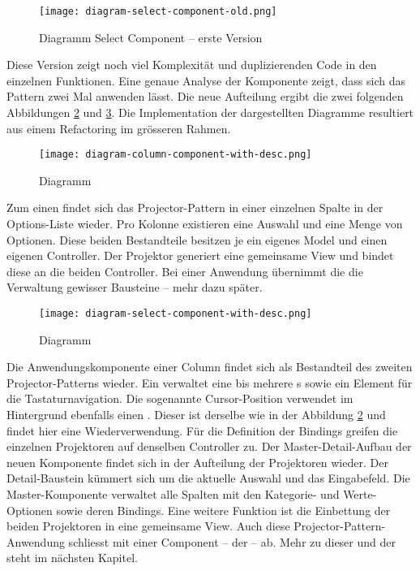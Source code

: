 \begin{figure}[!htb]
    \centering
    \texttt{[image: diagram-select-component-old.png]}
    \caption{\centering Diagramm Select Component – erste Version}
    \label{img:diagramSelectComponentOld}
\end{figure}

Diese Version zeigt noch viel Komplexität und duplizierenden Code in den einzelnen Funktionen. 
Eine genaue Analyse der Komponente zeigt, dass sich das Pattern zwei Mal anwenden lässt. 
Die neue Aufteilung ergibt die zwei folgenden Abbildungen \ref{img:diagramColumnComponent} und \ref{img:diagramSelectComponent}. 
Die Implementation der dargestellten Diagramme resultiert aus einem Refactoring im grösseren Rahmen. 

\begin{figure}[!htb]
    \centering
    \texttt{[image: diagram-column-component-with-desc.png]}
    \caption{\centering Diagramm }
    \label{img:diagramColumnComponent}
\end{figure}

Zum einen findet sich das Projector-Pattern in einer einzelnen Spalte in der Options-Liste wieder. 
Pro Kolonne existieren eine Auswahl und eine Menge von Optionen. 
Diese beiden Bestandteile besitzen je ein eigenes Model und einen eigenen Controller. 
Der Projektor generiert eine gemeinsame View und bindet diese an die beiden Controller. 
Bei einer Anwendung übernimmt die  die Verwaltung gewisser Bausteine – mehr dazu später.

\begin{figure}[!htb]
    \centering
    \texttt{[image: diagram-select-component-with-desc.png]}
    \caption{\centering Diagramm }
    \label{img:diagramSelectComponent}
\end{figure}

Die Anwendungskomponente einer Column findet sich als Bestandteil des zweiten Projector-Patterns wieder. 
Ein  verwaltet eine bis mehrere s sowie ein Element für die Tastaturnavigation. 
Die sogenannte Cursor-Position verwendet im Hintergrund ebenfalls einen . 
Dieser ist derselbe wie in der Abbildung \ref{img:diagramColumnComponent} und findet hier eine Wiederverwendung. 
Für die Definition der Bindings greifen die einzelnen Projektoren auf denselben Controller zu. 
Der Master-Detail-Aufbau der neuen Komponente findet sich in der Aufteilung der Projektoren wieder. 
Der Detail-Baustein kümmert sich um die aktuelle Auswahl und das Eingabefeld. 
Die Master-Komponente verwaltet alle Spalten mit den Kategorie- und Werte-Optionen sowie deren Bindings. 
Eine weitere Funktion ist die Einbettung der beiden Projektoren in eine gemeinsame View. 
Auch diese Projector-Pattern-Anwendung schliesst mit einer Component – der  – ab. 
Mehr zu dieser und der  steht im nächsten Kapitel. 


